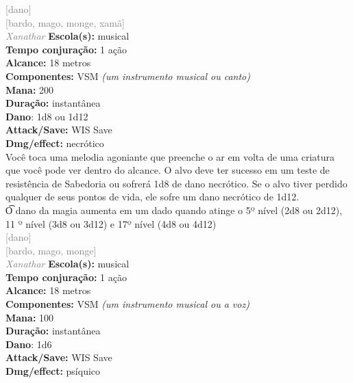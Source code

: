 \documentclass{RPG_Adventure}[2021/10/20]
\begin{document}
{\scriptsize \textcolor{gray}{[dano]\\}}
{\scriptsize \textcolor{gray}{[bardo, mago, monge, xamã]\\}}
{\tiny \textcolor{gray}{\textit{Xanathar}}}\jump{}
{\small \t \textbf{Escola(s):} musical\\\t \textbf{Tempo conjuração:} 1 ação\\\t \textbf{Alcance:} 18 metros\\\t \textbf{Componentes:} VSM \textit{(um instrumento musical ou canto)}\\\t \textbf{Mana:} 200\\\t \textbf{Duração:} instantânea\\\t \textbf{Dano}: 1d8 ou 1d12\\\t \textbf{Attack/Save:} WIS Save\\\t \textbf{Dmg/effect:} necrótico\\}
{\normalsize Você toca uma melodia agoniante que preenche o ar em volta de uma criatura que você pode ver dentro do alcance. O alvo deve ter sucesso em um teste de resistência de Sabedoria ou sofrerá 1d8 de dano necrótico. Se o alvo tiver perdido qualquer de seus pontos de vida, ele sofre um dano necrótico de 1d12.\\\t O dano da magia aumenta em um dado quando atinge o 5º nível (2d8 ou 2d12), 11 º nível (3d8 ou 3d12) e 17º nível (4d8 ou 4d12)\\}
{\scriptsize \textcolor{gray}{[dano]\\}}
{\scriptsize \textcolor{gray}{[bardo, mago, monge]\\}}
{\tiny \textcolor{gray}{\textit{Xanathar}}}\jump{}
{\small \t \textbf{Escola(s):} musical\\\t \textbf{Tempo conjuração:} 1 ação\\\t \textbf{Alcance:} 18 metros\\\t \textbf{Componentes:} VSM \textit{(um instrumento musical ou a voz)}\\\t \textbf{Mana:} 100\\\t \textbf{Duração:} instantânea\\\t \textbf{Dano}: 1d6\\\t \textbf{Attack/Save:} WIS Save\\\t \textbf{Dmg/effect:} psíquico\\}
\end{document}
